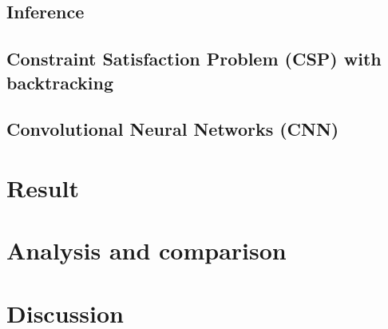\documentclass[10pt,twocolumn,letterpaper]{article}
\begin{document}
\subsection{Inference}

\subsection{Constraint Satisfaction Problem (CSP) with backtracking}

\subsection{Convolutional Neural Networks (CNN)}


\section{Result}

\section{Analysis and comparison}

\section{Discussion}



{\small


}
\end{document}

